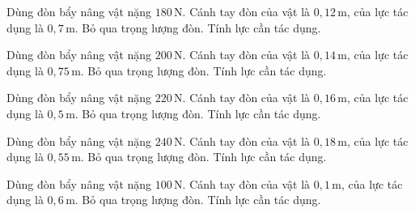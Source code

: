 \begin{ex}
Dùng đòn bẩy nâng vật nặng $180\,\text{N}$. Cánh tay đòn của vật là $0,12\,\text{m}$, của lực tác dụng là $0,7\,\text{m}$. Bỏ qua trọng lượng đòn. Tính lực cần tác dụng.
\end{ex}

\begin{ex}
Dùng đòn bẩy nâng vật nặng $200\,\text{N}$. Cánh tay đòn của vật là $0,14\,\text{m}$, của lực tác dụng là $0,75\,\text{m}$. Bỏ qua trọng lượng đòn. Tính lực cần tác dụng.
\end{ex}

\begin{ex}
Dùng đòn bẩy nâng vật nặng $220\,\text{N}$. Cánh tay đòn của vật là $0,16\,\text{m}$, của lực tác dụng là $0,5\,\text{m}$. Bỏ qua trọng lượng đòn. Tính lực cần tác dụng.
\end{ex}

\begin{bt}
Dùng đòn bẩy nâng vật nặng $240\,\text{N}$. Cánh tay đòn của vật là $0,18\,\text{m}$, của lực tác dụng là $0,55\,\text{m}$. Bỏ qua trọng lượng đòn. Tính lực cần tác dụng.
\end{bt}

\begin{bt}
Dùng đòn bẩy nâng vật nặng $100\,\text{N}$. Cánh tay đòn của vật là $0,1\,\text{m}$, của lực tác dụng là $0,6\,\text{m}$. Bỏ qua trọng lượng đòn. Tính lực cần tác dụng.
\end{bt}

